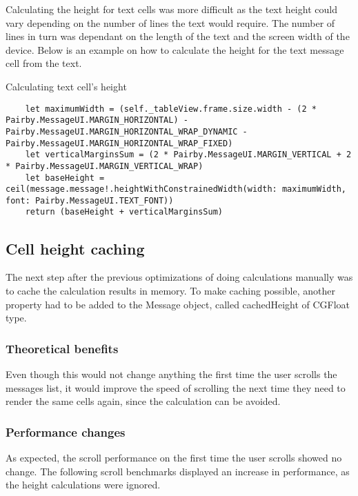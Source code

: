 \documentclass[a4paper,12pt]{article}
\begin{document}
Calculating the height for text cells was more difficult as the text height could vary depending on the number of lines the text would require. The number of lines in turn was dependant on the length of the text and the screen width of the device. Below is an example on how to calculate the height for the text message cell from the text.
\begin{listing}[H]
  \caption{Calculating text cell's height}
  \begin{verbatim}
    let maximumWidth = (self._tableView.frame.size.width - (2 * Pairby.MessageUI.MARGIN_HORIZONTAL) - Pairby.MessageUI.MARGIN_HORIZONTAL_WRAP_DYNAMIC - Pairby.MessageUI.MARGIN_HORIZONTAL_WRAP_FIXED)
    let verticalMarginsSum = (2 * Pairby.MessageUI.MARGIN_VERTICAL + 2 * Pairby.MessageUI.MARGIN_VERTICAL_WRAP)
    let baseHeight = ceil(message.message!.heightWithConstrainedWidth(width: maximumWidth, font: Pairby.MessageUI.TEXT_FONT))
    return (baseHeight + verticalMarginsSum)
  \end{verbatim}
\end{listing}

\subsection{Cell height caching}
The next step after the previous optimizations of doing calculations manually was to cache the calculation results in memory. To make caching possible, another property had to be added to the Message object, called cachedHeight of CGFloat type.

\subsubsection*{Theoretical benefits}
Even though this would not change anything the first time the user scrolls the messages list, it would improve the speed of scrolling the next time they need to render the same cells again, since the calculation can be avoided.

\subsubsection*{Performance changes}
As expected, the scroll performance on the first time the user scrolls showed no change. The following scroll benchmarks displayed an increase in performance, as the height calculations were ignored.
\end{document}
